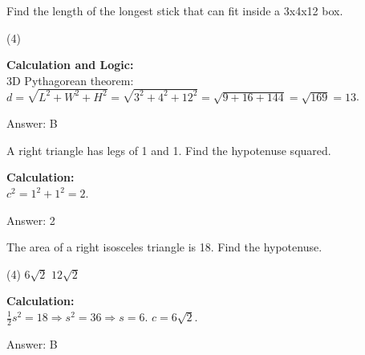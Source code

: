 \documentclass[11pt,paper=a4,answers]{exam}
\begin{document}
\begin{questions}
\vspace{60pt}

\question
Find the length of the longest stick that can fit inside a 3x4x12 box.
\begin{tasks}(4)
\end{tasks}

\begin{solution}
\textbf{Calculation and Logic:} \\
3D Pythagorean theorem: $d = \sqrt{L^2 + W^2 + H^2} = \sqrt{3^2 + 4^2 + 12^2} = \sqrt{9 + 16 + 144} = \sqrt{169} = 13$.

\vspace{30pt}

Answer: \colorbox{yellow!100}{B}
\end{solution}

\vspace{60pt}

\question
A right triangle has legs of 1 and 1. Find the hypotenuse squared.

\begin{solution}
\textbf{Calculation:} \\
$c^2 = 1^2 + 1^2 = 2$.

\vspace{30pt}

Answer: \colorbox{yellow!100}{2}
\end{solution}

\vspace{60pt}

\question
The area of a right isosceles triangle is 18. Find the hypotenuse.
\begin{tasks}(4)
    \task $6\sqrt{2}$
    \task $12\sqrt{2}$
\end{tasks}

\begin{solution}
\textbf{Calculation:} \\
$\frac{1}{2}s^2 = 18 \Rightarrow s^2 = 36 \Rightarrow s = 6$. $c = 6\sqrt{2}$.

\vspace{30pt}

Answer: \colorbox{yellow!100}{B}
\end{solution}


\end{questions}
\end{document}
